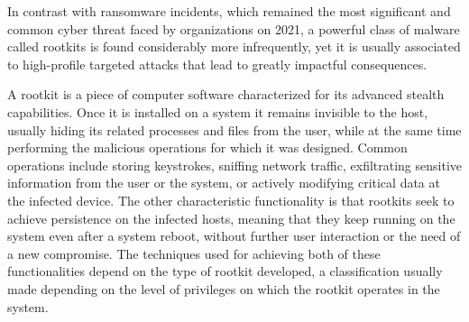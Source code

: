 \documentclass[12pt]{report} %
\begin{document}
In contrast with ransomware incidents, which remained the most significant and common cyber threat faced by organizations on 2021\cite{ransomware_pwc}, a powerful class of malware called rootkits is found considerably more infrequently, yet it is usually associated to high-profile targeted attacks that lead to greatly impactful consequences. 

A rootkit is a piece of computer software characterized for its advanced stealth capabilities. Once it is installed on a system it remains invisible to the host, usually hiding its related processes and files from the user, while at the same time performing the malicious operations for which it was designed. Common operations include storing keystrokes, sniffing network traffic, exfiltrating sensitive information from the user or the system, or actively modifying critical data at the infected device. The other characteristic functionality is that rootkits seek to achieve persistence on the infected hosts, meaning that they keep running on the system even after a system reboot, without further user interaction or the need of a new compromise.
The techniques used for achieving both of these functionalities depend on the type of rootkit developed, a classification usually made depending on the level of privileges on which the rootkit operates in the system.
\end{document}
